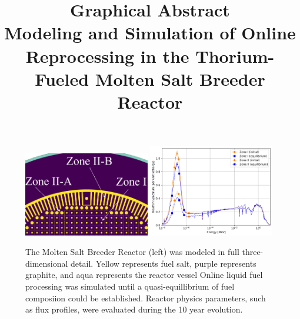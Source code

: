 \documentclass[review]{elsarticle}
\begin{document}
\begin{frontmatter}
\title{Graphical Abstract\\
Modeling and Simulation of Online Reprocessing in the Thorium-Fueled Molten Salt Breeder Reactor}
\date{}                     %

\end{frontmatter}

\begin{figure}[htbp!]
    \begin{center}
        \includegraphics[width=0.49\textwidth]{ser_zone_II.png}
        \includegraphics[width=0.49\textwidth]{spectrum_zones.png}
    \end{center}
    \label{fig:graph-abs}
    \caption{The Molten Salt Breeder Reactor (left) was modeled in full
three-dimensional detail.  Yellow represents fuel salt, purple represents
graphite, and aqua represents the reactor vessel Online liquid fuel processing
was simulated until a quasi-equillibrium of fuel composiion could be
established. Reactor physics parameters, such as flux profiles, were evaluated
during the 10 year evolution.}
\end{figure}
\end{document}
